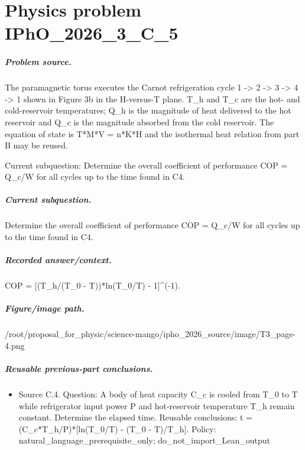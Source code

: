 
\chapter{Physics problem IPhO\_2026\_3\_C\_5}
\label{ch:IPhO2026Problems_problem_IPhO_2026_3_C_5}

\paragraph{Problem source.}
The paramagnetic torus executes the Carnot refrigeration cycle
1 -> 2 -> 3 -> 4 -> 1 shown in Figure 3b in the H-versus-T plane.  T\_h and T\_c
are the hot- and cold-reservoir temperatures; Q\_h is the magnitude of heat
delivered to the hot reservoir and Q\_c is the magnitude absorbed from the cold
reservoir.  The equation of state is T*M*V = n*K*H and the isothermal heat
relation from part B may be reused.

Current subquestion:
Determine the overall coefficient of performance COP = Q\_c/W for all cycles up to the time found in C4.

\paragraph{Current subquestion.}
Determine the overall coefficient of performance COP = Q\_c/W for all cycles up to the time found in C4.

\paragraph{Recorded answer/context.}
COP = [(T\_h/(T\_0 - T))*ln(T\_0/T) - 1]\textasciicircum{}(-1).

\paragraph{Figure/image path.}
/root/proposal\_for\_physic/science-mango/ipho\_2026\_source/image/T3\_page-4.png

\paragraph{Reusable previous-part conclusions.}
\begin{itemize}
\item Source C.4. Question: A body of heat capacity C\_c is cooled from T\_0 to T while refrigerator input power P and hot-reservoir temperature T\_h remain constant. Determine the elapsed time. Reusable conclusions: t = (C\_c*T\_h/P)*[ln(T\_0/T) - (T\_0 - T)/T\_h]. Policy: natural\_language\_prerequisite\_only; do\_not\_import\_Lean\_output
\end{itemize}

